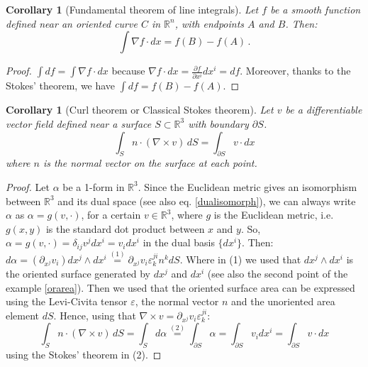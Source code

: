 \documentclass[a4paper,11pt,titlepage, article, oneside]{memoir}
\numberwithin{equation}{section}
\newtheorem{corollary}[theorem]{Corollary}
\theoremstyle{definition}
\theoremstyle{remark}
\newcommand{\rfield}{\mathbb{R}}
\begin{document}
\begin{corollary}[Fundamental theorem of line integrals]
  Let $f$ be a smooth function defined near an oriented curve $C$ in $\rfield^n$, with endpoints $A$ and $B$.
  Then:
  \begin{equation}
    \int \nabla f \cdot dx = f(B)-f(A) \, . %
  \end{equation}
\end{corollary}
\begin{proof}
	$\int df = \int \nabla f \cdot dx$ because $\nabla f \cdot dx = \frac{\partial f}{\partial x^i} dx^i = df$. Moreover, thanks to the Stokes' theorem, we have $\int df  = f(B) - f(A)$.
\end{proof}

\begin{corollary}[Curl theorem or Classical Stokes theorem]
  Let $v$ be a differentiable vector field defined near a surface $S \subset \rfield^3$ with boundary $\partial S$.
  \begin{equation}
    \int_S n \cdot (\nabla \times v) \, dS = \int_{\partial S} v \cdot dx
  \end{equation}
  where $n$ is the normal vector on the surface at each point.
\end{corollary}
\begin{proof}
Let $\alpha$ be a 1-form in $\rfield^3$. Since the Euclidean metric gives an isomorphism between $\rfield^3$ and its dual space (see also eq. \eqref{dualisomorph}), we can always write $\alpha$ as $\alpha = g(v, \cdot)$, for a certain $v \in \rfield^3$, where $g$ is the Euclidean metric, i.e. $g(x, y)$ is the standard dot product between $x$ and $y$. So, $\alpha = g(v, \cdot) = \delta_{ij} v^j dx^i = v_i dx^i$ in the dual basis $\{dx^i\}$. Then: $d \alpha = (\partial_{x^j} v_i) dx^j \wedge dx^i \overset{(1)}{=} \partial_{x^j} v_i \varepsilon^{ji}_k n^k dS$. Where in (1) we used that $dx^j \wedge dx^i$ is the oriented surface generated by $dx^j$ and $dx^i$ (see also the second point of the example \ref{orarea}). Then we used that the oriented surface area can be expressed using the Levi-Civita tensor $\varepsilon$, the normal vector $n$ and the unoriented area element $dS$. Hence, using that $\nabla \times v = \partial_{x^j} v_i \varepsilon^{ji}_k$:
$$\int_S n \cdot (\nabla \times v) \, dS = \int_S d\alpha \overset{(2)}{=} \int_{\partial S} \alpha = \int_{\partial S} v_i dx^i = \int_{\partial S} v \cdot dx$$
using the Stokes' theorem in (2).
\end{proof}
\end{document}
